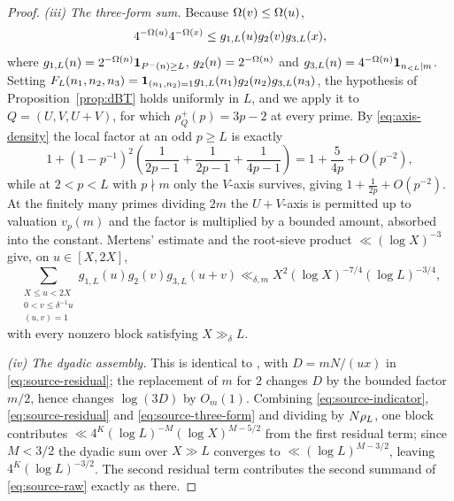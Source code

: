 \documentclass[11pt]{article}
\begin{document}
\begin{proof}
\emph{(iii) The three-form sum.} Because \(\Omega(v)\leq\Omega(u)\),
\[
 4^{-\Omega(u)}4^{-\Omega(x)}\leq g_{1,L}(u)g_2(v)g_{3,L}(x),
\]
where \(g_{1,L}(n)=2^{-\Omega(n)}\mathbf 1_{P^-(n)\geq L}\),
\(g_2(n)=2^{-\Omega(n)}\) and
\(g_{3,L}(n)=4^{-\Omega(n)}\mathbf 1_{n_{<L}\mid m}\). Setting
\(F_L(n_1,n_2,n_3)=\mathbf 1_{(n_1,n_2)=1}g_{1,L}(n_1)g_2(n_2)g_{3,L}(n_3)\), the
hypothesis of Proposition~\ref{prop:dBT} holds uniformly in \(L\), and we apply it to
\(Q=(U,V,U+V)\), for which \(\rho_Q^+(p)=3p-2\) at every prime. By
\eqref{eq:axis-density} the local factor at an odd \(p\geq L\) is exactly
\[
 1+(1-p^{-1})^2\left(\frac1{2p-1}+\frac1{2p-1}+\frac1{4p-1}\right)
 =1+\frac{5}{4p}+O(p^{-2}),
\]
while at \(2<p<L\) with \(p\nmid m\) only the \(V\)-axis survives, giving
\(1+\frac1{2p}+O(p^{-2})\). At the finitely many primes dividing \(2m\) the
\(U+V\)-axis is permitted up to valuation \(v_p(m)\) and the factor is
multiplied by a bounded amount, absorbed into the constant. Mertens'
estimate and the root-sieve product \(\ll(\log X)^{-3}\) give, on
\(u\in[X,2X]\),
\begin{equation}\label{eq:source-three-form}
 \sum_{\substack{X\leq u<2X\\0<v\leq\delta^{-1}u\\(u,v)=1}}
 g_{1,L}(u)g_2(v)g_{3,L}(u+v)
 \ll_{\delta,m}X^2(\log X)^{-7/4}(\log L)^{-3/4},
\end{equation}
with every nonzero block satisfying \(X\gg_\delta L\).

\emph{(iv) The dyadic assembly.} This is identical to
\cite[Prop.~4.2]{DellaPietra2026}, with \(D=mN/(ux)\) in
\eqref{eq:source-residual}; the replacement of \(m\) for \(2\) changes \(D\)
by the bounded factor \(m/2\), hence changes \(\log(3D)\) by \(O_m(1)\).
Combining \eqref{eq:source-indicator}, \eqref{eq:source-residual} and
\eqref{eq:source-three-form} and dividing by \(N\rho_L\), one block
contributes \(\ll4^K(\log L)^{-M}(\log X)^{M-5/2}\) from the first residual
term; since \(M<3/2\) the dyadic sum over \(X\gg L\) converges to
\(\ll(\log L)^{M-3/2}\), leaving \(4^K(\log L)^{-3/2}\). The second residual
term contributes the second summand of \eqref{eq:source-raw} exactly as
there.
\end{proof}
\end{document}
